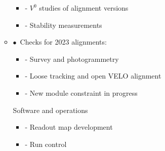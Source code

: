 \documentclass[aspectratio=1610, 12pt, xcolor=dvipsnames]{beamer}
\begin{document}
\begin{frame}
\begin{columns}
\begin{column}[c]{0.66\textwidth}
\begin{itemize}
\begin{itemize}
\begin{itemize}
            \item - $V^0$ studies of alignment versions
            \item - Stability measurements
          \end{itemize}
          \item $\bullet$\, Checks for 2023 alignments:
          \begin{itemize}
            \item - Survey and photogrammetry
      	    \item - Loose tracking and open VELO alignment
	          \item - New module constraint in progress 
          \end{itemize}
          Software and operations
          \begin{itemize}
            \item - Readout map development
            \item - Run control
          \end{itemize}
        \end{itemize}
      \end{itemize}
    \end{column}
  \end{columns}
\end{frame}
\end{document}
